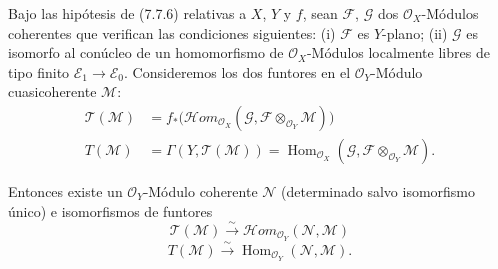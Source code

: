 \begin{corollary}[7.7.8]
Bajo las hipótesis de \textup{(7.7.6)} relativas a $X$, $Y$ y $f$, sean $\mathscr F$,
$\mathscr G$ dos $\mathscr O_X$-Módulos coherentes que verifican las condiciones
siguientes: \textup{(i)} $\mathscr F$ es $Y$-plano; \textup{(ii)} $\mathscr G$ es isomorfo al
conúcleo de un homomorfismo de $\mathscr O_X$-Módulos localmente libres de tipo
finito $\mathscr E_1\to\mathscr E_0$. Consideremos los dos funtores en el
$\mathscr O_Y$-Módulo cuasicoherente $\mathscr M$:
\begin{align*}
  \mathscr T(\mathscr M)
  &=
  f_*
  \bigl(
    \mathscr{H}\!om_{\mathscr O_X}
      (\mathscr G,\mathscr F\otimes_{\mathscr O_Y}\mathscr M)
  \bigr)\\
  T(\mathscr M)
  &=
  \Gamma(Y,\mathscr T(\mathscr M))
  =
  \operatorname{Hom}_{\mathscr O_X}
    (\mathscr G,\mathscr F\otimes_{\mathscr O_Y}\mathscr M).
\end{align*}

Entonces existe un $\mathscr O_Y$-Módulo coherente $\mathscr N$ (determinado salvo
isomorfismo único) e isomorfismos de funtores
\[
  \mathscr T(\mathscr M)
  \xrightarrow{\sim}
  \mathscr{H}\!om_{\mathscr O_Y}(\mathscr N,\mathscr M)
  \tag{7.7.8.1}\label{III.7.7.8.1.fr}
\]
\[
  T(\mathscr M)
  \xrightarrow{\sim}
  \operatorname{Hom}_{\mathscr O_Y}(\mathscr N,\mathscr M).
  \tag{7.7.8.2}\label{III.7.7.8.2.fr}
\]
\end{corollary}

